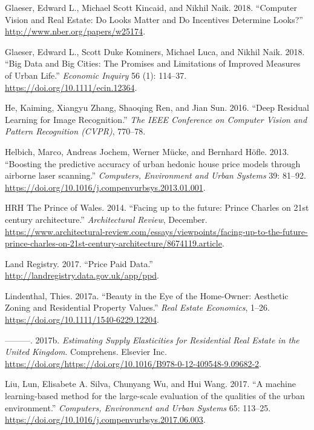 \documentclass[]{article}
\begin{document}
\leavevmode\hypertarget{ref-GlaeserKincaidNaik2018}{}%
Glaeser, Edward L., Michael Scott Kincaid, and Nikhil Naik. 2018.
``Computer Vision and Real Estate: Do Looks Matter and Do Incentives
Determine Looks?'' \url{http://www.nber.org/papers/w25174}.

\leavevmode\hypertarget{ref-Glaeser2016}{}%
Glaeser, Edward L., Scott Duke Kominers, Michael Luca, and Nikhil Naik.
2018. ``Big Data and Big Cities: The Promises and Limitations of
Improved Measures of Urban Life.'' \emph{Economic Inquiry} 56 (1):
114--37. \url{https://doi.org/10.1111/ecin.12364}.

\leavevmode\hypertarget{ref-He2016}{}%
He, Kaiming, Xiangyu Zhang, Shaoqing Ren, and Jian Sun. 2016. ``Deep
Residual Learning for Image Recognition.'' \emph{The IEEE Conference on
Computer Vision and Pattern Recognition (CVPR)}, 770--78.

\leavevmode\hypertarget{ref-Helbich2013}{}%
Helbich, Marco, Andreas Jochem, Werner Mücke, and Bernhard Höfle. 2013.
``Boosting the predictive accuracy of urban hedonic house price models
through airborne laser scanning.'' \emph{Computers, Environment and
Urban Systems} 39: 81--92.
\url{https://doi.org/10.1016/j.compenvurbsys.2013.01.001}.

\leavevmode\hypertarget{ref-princecharles2014}{}%
HRH The Prince of Wales. 2014. ``Facing up to the future: Prince Charles
on 21st century architecture.'' \emph{Architectural Review}, December.
\url{https://www.architectural-review.com/essays/viewpoints/facing-up-to-the-future-prince-charles-on-21st-century-architecture/8674119.article}.

\leavevmode\hypertarget{ref-LandRegistry2016a}{}%
Land Registry. 2017. ``Price Paid Data.''
\url{http://landregistry.data.gov.uk/app/ppd}.

\leavevmode\hypertarget{ref-Lindenthal2017b}{}%
Lindenthal, Thies. 2017a. ``Beauty in the Eye of the Home-Owner:
Aesthetic Zoning and Residential Property Values.'' \emph{Real Estate
Economics}, 1--26. \url{https://doi.org/10.1111/1540-6229.12204}.

\leavevmode\hypertarget{ref-Lindenthal2017}{}%
---------. 2017b. \emph{Estimating Supply Elasticities for Residential
Real Estate in the United Kingdom}. Comprehens. Elsevier Inc.
\url{https://doi.org/https://doi.org/10.1016/B978-0-12-409548-9.09682-2}.

\leavevmode\hypertarget{ref-Liu2017}{}%
Liu, Lun, Elisabete A. Silva, Chunyang Wu, and Hui Wang. 2017. ``A
machine learning-based method for the large-scale evaluation of the
qualities of the urban environment.'' \emph{Computers, Environment and
Urban Systems} 65: 113--25.
\url{https://doi.org/10.1016/j.compenvurbsys.2017.06.003}.
\end{document}
